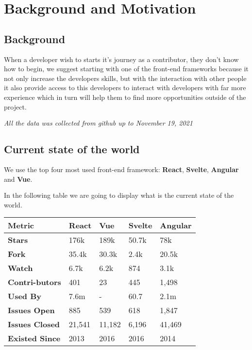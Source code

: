 \section{Background and Motivation}
\subsection{Background}
When a developer wish to starts it's journey as a contributor, they don't know how to begin, we suggest starting with one of the front-end frameworks because it not only increase the developers skills, but with the interaction with other people it also provide access to this developers to interact with developers with far more experience which in turn will help them to find more opportunities outside of the project.

\noindent
\textit{All the data was collected from github up to November 19, 2021}

\subsection{Current state of the world}
We use the top four most used front-end framework: \textbf{React}, \textbf{Svelte}, \textbf{Angular} and \textbf{Vue}.

In the following table we are going to display what is the current state of the world.

\begin{center}
    \fontsize{7pt}{10pt}
    \selectfont
    \begin{tabular}{|p{1.2cm} | p{1cm} | p{1cm}| p{1cm}| p{1cm} |}
        \hline
        \textbf{Metric} & \textbf{React} & \textbf{Vue} & \textbf{Svelte} & \textbf{Angular}\\
        \hline
        \textbf{Stars} & 176k & 189k & 50.7k & 78k \\
        \hline
        \textbf{Fork} & 35.4k & 30.3k & 2.4k & 20.5k \\
        \hline
        \textbf{Watch} & 6.7k & 6.2k & 874 & 3.1k \\
        \hline
        \textbf{Contri-butors} & 401  & 23 & 445 & 1,498  \\
        \hline
        \textbf{Used By} & 7.6m  & -  & 60.7 & 2.1m \\
        \hline
        \textbf{Issues Open} & 885 & 539 & 618 & 1,847 \\
        \hline
        \textbf{Issues Closed} & 21,541 & 11,182 & 6,196 & 41,469 \\
        \hline
        \textbf{Existed Since} & 2013 & 2016 & 2016 & 2014 \\
        \hline
    \end{tabular}
\end{center}
